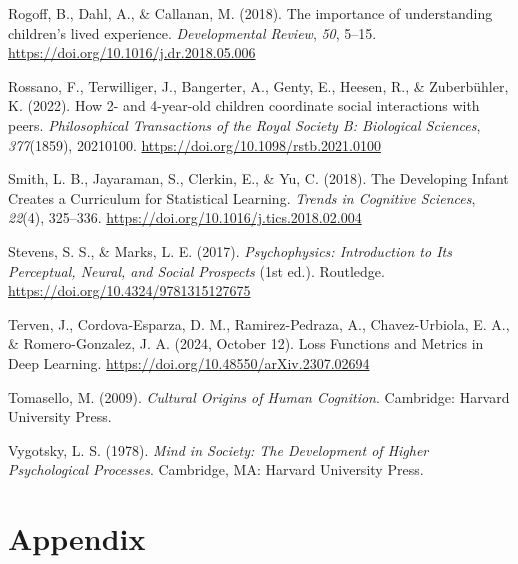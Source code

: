 \documentclass[
  man,floatsintext]{apa6}
\newlength{\cslhangindent}
\newenvironment{CSLReferences}[2] %
 {\begin{list}{}{%
  \setlength{\itemindent}{0pt}
  \setlength{\leftmargin}{0pt}
  \setlength{\parsep}{0pt}
  \ifodd #1
   \setlength{\leftmargin}{\cslhangindent}
   \setlength{\itemindent}{-1\cslhangindent}
  \fi
  \setlength{\itemsep}{#2\baselineskip}}}
 {\end{list}}
\begin{document}
\begin{CSLReferences}{1}{0}
Rogoff, B., Dahl, A., \& Callanan, M. (2018). The importance of understanding children's lived experience. \emph{Developmental Review}, \emph{50}, 5--15. \url{https://doi.org/10.1016/j.dr.2018.05.006}

Rossano, F., Terwilliger, J., Bangerter, A., Genty, E., Heesen, R., \& Zuberbühler, K. (2022). How 2- and 4-year-old children coordinate social interactions with peers. \emph{Philosophical Transactions of the Royal Society B: Biological Sciences}, \emph{377}(1859), 20210100. \url{https://doi.org/10.1098/rstb.2021.0100}

Smith, L. B., Jayaraman, S., Clerkin, E., \& Yu, C. (2018). The {Developing Infant Creates} a {Curriculum} for {Statistical Learning}. \emph{Trends in Cognitive Sciences}, \emph{22}(4), 325--336. \url{https://doi.org/10.1016/j.tics.2018.02.004}

Stevens, S. S., \& Marks, L. E. (2017). \emph{Psychophysics: {Introduction} to {Its Perceptual}, {Neural}, and {Social Prospects}} (1st ed.). Routledge. \url{https://doi.org/10.4324/9781315127675}

Terven, J., Cordova-Esparza, D. M., Ramirez-Pedraza, A., Chavez-Urbiola, E. A., \& Romero-Gonzalez, J. A. (2024, October 12). Loss {Functions} and {Metrics} in {Deep Learning}. \url{https://doi.org/10.48550/arXiv.2307.02694}

Tomasello, M. (2009). \emph{Cultural {Origins} of {Human Cognition}}. Cambridge: Harvard University Press.

Vygotsky, L. S. (1978). \emph{Mind in {Society}: {The Development} of {Higher Psychological Processes}}. Cambridge, MA: Harvard University Press.

\end{CSLReferences}

\endgroup

\newpage

\section{Appendix}\label{appendix}
\end{document}
